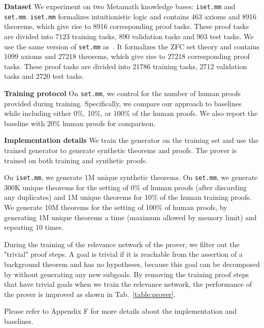 \documentclass{article}
\begin{document}
\noindent\textbf{Dataset}
We experiment on two Metamath knowledge bases:  \texttt{iset.mm} and \texttt{set.mm}. 
\texttt{iset.mm} formalizes intuitionistic logic and 
contains 463 axioms and 8916 theorems, which give rise to 8916 corresponding proof tasks. These proof tasks are divided into 7123 training tasks, 890 validation tasks and 903 test tasks. 
We use the same version of \texttt{set.mm} as~\citet{whalen2016holophrasm}. 
It formalizes the ZFC set theory
and contains 1099 axioms and 27218 theorems, 
which give rise to 27218 corresponding proof tasks. These proof tasks are divided into 21786 training tasks, 2712 validation tasks and 2720 test tasks.

\noindent\textbf{Training protocol}
On \texttt{set.mm}, we control for the number of human proofs provided during training. Specifically, we compare our approach to baselines while including either 0\%, 10\%, or 100\% of the human proofs. We also report the baseline with 20\% human proofs for comparison.

\noindent\textbf{Implementation details}
We train the generator on the training set and use the trained generator to generate synthetic theorems and proofs. The prover is trained on both training and synthetic proofs.

On \texttt{iset.mm}, we generate 1M unique synthetic theorems. 
On \texttt{set.mm}, we generate 300K unique theorems for the setting of 0\% of human proofs (after discarding any duplicates) and 1M unique theorems for 10\% of the human training proofs. We generate 10M theorems for the setting of 100\% of human proofs, by generating 1M unique theorems a time (maximum allowed by memory limit) and repeating 10 times. 

During the training of the relevance network of the prover, 
we filter out the "trivial" proof steps.
A goal is trivial if it is reachable from the assertion of a background theorem  and  has no hypotheses, 
because this goal can be decomposed by  without generating any new subgoals. 
By removing the training proof steps that have trivial goals
when we train the relevance network,
the performance of the prover is improved as shown in Tab.~\ref{table:prover}.

Please refer to 
Appendix F for more details
about the implementation and baselines.
\end{document}
